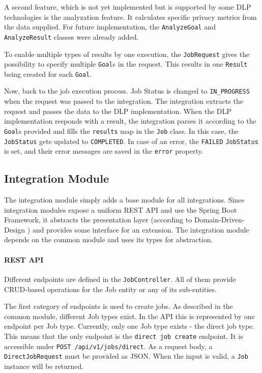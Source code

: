 A second feature, which is not yet implemented but is supported by some DLP technologies is the analyzation feature. It calculates specific privacy metrics from the data supplied. For future implementation, the \texttt{AnalyzeGoal} and \texttt{AnalyzeResult} classes were already added.

To enable multiple types of results by one execution, the \texttt{JobRequest} gives the possibility to specify multiple \texttt{Goal}s in the request. This results in one \texttt{Result} being created for each \texttt{Goal}.

Now, back to the job execution process. Job Status is changed to \texttt{IN\_PROGRESS} when the request was passed to the integration. The integration extracts the request and passes the data to the DLP implementation. When the DLP implementation responds with a result, the integration parses it according to the \texttt{Goal}s provided and fills the \texttt{results} map in the \texttt{Job} class. In this case, the \texttt{JobStatus} gets updated to \texttt{COMPLETED}. In case of an error, the \texttt{FAILED} \texttt{JobStatus} is set, and their error messages are saved in the \texttt{error} property.

\subsection{Integration Module}

The integration module simply adds a base module for all integrations. Since integration modules expose a uniform REST API and use the Spring Boot Framework, it abstracts the presentation layer (according to Domain-Driven-Design \cite{millett_patterns_2015}) and provides some interface for an extension. The integration module depends on the common module and uses its types for abstraction. 

\paragraph{REST API}
Different endpoints are defined in the \texttt{JobController}. All of them provide CRUD-based operations for the Job entity or any of its sub-entities.

The first category of endpoints is used to create jobs. As described in the common module, different Job types exist. In the API this is represented by one endpoint per Job type. Currently, only one Job type exists - the direct job type. This means that the only endpoint is the \texttt{direct job create} endpoint. It is accessible under \texttt{POST /api/v1/jobs/direct}. As a request body, a \texttt{DirectJobRequest} must be provided as JSON. When the input is valid, a \texttt{Job} instance will be returned.

